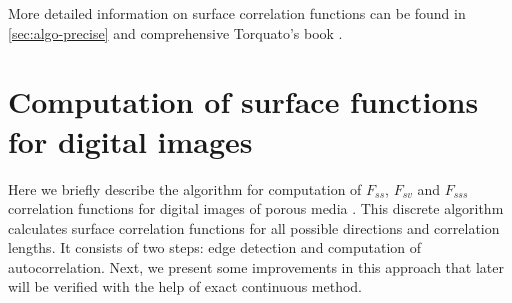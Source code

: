\documentclass[1p]{elsarticle}
\begin{document}
More detailed information on surface correlation functions can be found in
\cref{sec:algo-precise} and comprehensive Torquato's book \cite{Torquato_book}.

\section{Computation of surface functions for digital images}
\label{sec:algo}
Here we briefly describe the algorithm for computation of $F_{ss}$, $F_{sv}$ and
$F_{sss}$ correlation functions for digital images of porous media
\cite{Samarin}. This discrete algorithm calculates surface correlation functions
for all possible directions and correlation lengths. It consists of two steps:
edge detection and computation of autocorrelation. Next, we present some
improvements in this approach that later will be verified with the help of exact
continuous method.
\end{document}
